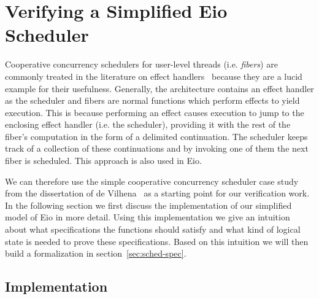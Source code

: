 \section{Verifying a Simplified Eio Scheduler}
\label{sec:scheduler}


Cooperative concurrency schedulers for user-level threads (i.e. \textit{fibers}) are commonly treated in the literature on effect handlers~\cite{dolan2018concurrent,leijen2017structured,de2021separation} because they are a lucid example for their usefulness.
Generally, the architecture contains an effect handler as the scheduler and fibers are normal functions which perform effects to yield execution.
This is because performing an effect causes execution to jump to the enclosing effect handler (i.e. the scheduler), providing it with the rest of the fiber's computation in the form of a delimited continuation.
The scheduler keeps track of a collection of these continuations and by invoking one of them the next fiber is scheduled.
This approach is also used in Eio.

We can therefore use the simple cooperative concurrency scheduler case study from the dissertation of de Vilhena~\cite{de2022proof} as a starting point for our verification work.
In the following section we first discuss the implementation of our simplified model of Eio in more detail.
Using this implementation we give an intuition about what specifications the functions should satisfy and what kind of logical state is needed to prove these specifications.
Based on this intuition we will then build a formalization in section~\ref{sec:sched-spec}.

\subsection{Implementation}
\label{sec:sched-impl}

